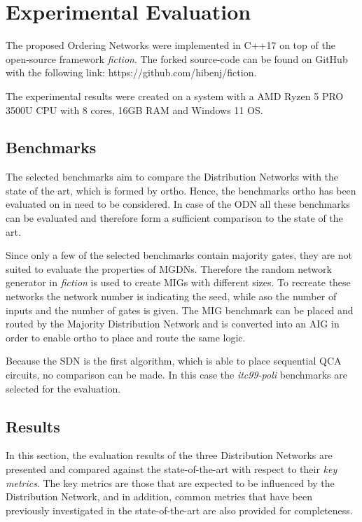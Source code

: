 \chapter{Experimental Evaluation}\label{chapter:ExpEval}

The proposed Ordering Networks were implemented in C++17 on top of the open-source framework \textit{fiction}. The forked source-code can be found on GitHub with the following link: https://github.com/hibenj/fiction. 

The experimental results were created on a system with a AMD Ryzen 5 PRO 3500U CPU with 8 cores, 16GB RAM and Windows 11 OS.

\section{Benchmarks}
The selected benchmarks aim to compare the Distribution Networks with the state of the art, which is formed by ortho. Hence, the benchmarks \cite{fontes, trindade2016placement, epfl, iscas} ortho has been evaluated on in \cite{ortho} need to be considered. In case of the ODN all these benchmarks can be evaluated and therefore form a sufficient comparison to the state of the art.

Since only a few of the selected benchmarks contain majority gates, they are not suited to evaluate the properties of MGDNs. Therefore the random network generator in \textit{fiction} is used to create MIGs with different sizes. To recreate these networks the network number is indicating the seed, while aso the number of inputs and the number of gates is given. The MIG benchmark can be placed and routed by the Majority Distribution Network and is converted into an AIG in order to enable ortho to place and route the same logic.

Because the SDN is the first algorithm, which is able to place sequential QCA circuits, no comparison can be made. In this case the \textit{itc99-poli} \cite{itc_poli} benchmarks are selected for the evaluation.

\section{Results}
In this section, the evaluation results of the three Distribution Networks are presented and compared against the state-of-the-art with respect to their \textit{key metrics}. The key metrics are those that are expected to be influenced by the Distribution Network, and in addition, common metrics that have been previously investigated in the state-of-the-art are also provided for completeness.

